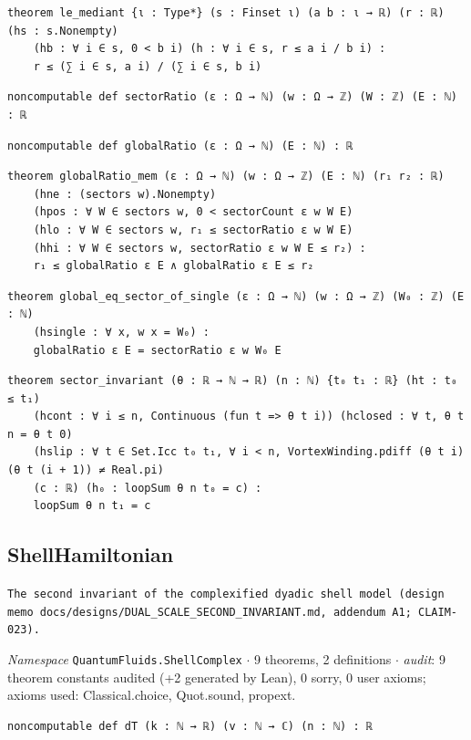 \begin{lstlisting}[style=leancat]
theorem le_mediant {ι : Type*} (s : Finset ι) (a b : ι → ℝ) (r : ℝ) (hs : s.Nonempty)
    (hb : ∀ i ∈ s, 0 < b i) (h : ∀ i ∈ s, r ≤ a i / b i) :
    r ≤ (∑ i ∈ s, a i) / (∑ i ∈ s, b i)
\end{lstlisting}

\begin{lstlisting}[style=leancat]
noncomputable def sectorRatio (ε : Ω → ℕ) (w : Ω → ℤ) (W : ℤ) (E : ℕ) : ℝ
\end{lstlisting}

\begin{lstlisting}[style=leancat]
noncomputable def globalRatio (ε : Ω → ℕ) (E : ℕ) : ℝ
\end{lstlisting}

\begin{lstlisting}[style=leancat]
theorem globalRatio_mem (ε : Ω → ℕ) (w : Ω → ℤ) (E : ℕ) (r₁ r₂ : ℝ)
    (hne : (sectors w).Nonempty)
    (hpos : ∀ W ∈ sectors w, 0 < sectorCount ε w W E)
    (hlo : ∀ W ∈ sectors w, r₁ ≤ sectorRatio ε w W E)
    (hhi : ∀ W ∈ sectors w, sectorRatio ε w W E ≤ r₂) :
    r₁ ≤ globalRatio ε E ∧ globalRatio ε E ≤ r₂
\end{lstlisting}

\begin{lstlisting}[style=leancat]
theorem global_eq_sector_of_single (ε : Ω → ℕ) (w : Ω → ℤ) (W₀ : ℤ) (E : ℕ)
    (hsingle : ∀ x, w x = W₀) :
    globalRatio ε E = sectorRatio ε w W₀ E
\end{lstlisting}

\begin{lstlisting}[style=leancat]
theorem sector_invariant (θ : ℝ → ℕ → ℝ) (n : ℕ) {t₀ t₁ : ℝ} (ht : t₀ ≤ t₁)
    (hcont : ∀ i ≤ n, Continuous (fun t => θ t i)) (hclosed : ∀ t, θ t n = θ t 0)
    (hslip : ∀ t ∈ Set.Icc t₀ t₁, ∀ i < n, VortexWinding.pdiff (θ t i) (θ t (i + 1)) ≠ Real.pi)
    (c : ℝ) (h₀ : loopSum θ n t₀ = c) :
    loopSum θ n t₁ = c
\end{lstlisting}

\subsection{ShellHamiltonian}\label{appA:ShellHamiltonian}
{\footnotesize\raggedright\texttt{The second invariant of the complexified dyadic shell model (design memo docs/\allowbreak{}designs/\allowbreak{}DUAL\_\allowbreak{}SCALE\_\allowbreak{}SECOND\_\allowbreak{}INVARIANT.\allowbreak{}md,\allowbreak{} addendum A1; CLAIM-\allowbreak{}023).\allowbreak{}}\par}
{\footnotesize\raggedright\emph{Namespace} \texttt{QuantumFluids.\allowbreak{}ShellComplex} $\cdot$ 9 theorems, 2 definitions $\cdot$ \emph{audit}: 9 theorem constants audited (+2 generated by Lean), 0 sorry, 0 user axioms; axioms used: Classical.choice, Quot.sound, propext.\par}
\vspace{1pt}
\begin{lstlisting}[style=leancat]
noncomputable def dT (k : ℕ → ℝ) (v : ℕ → ℂ) (n : ℕ) : ℝ
\end{lstlisting}

